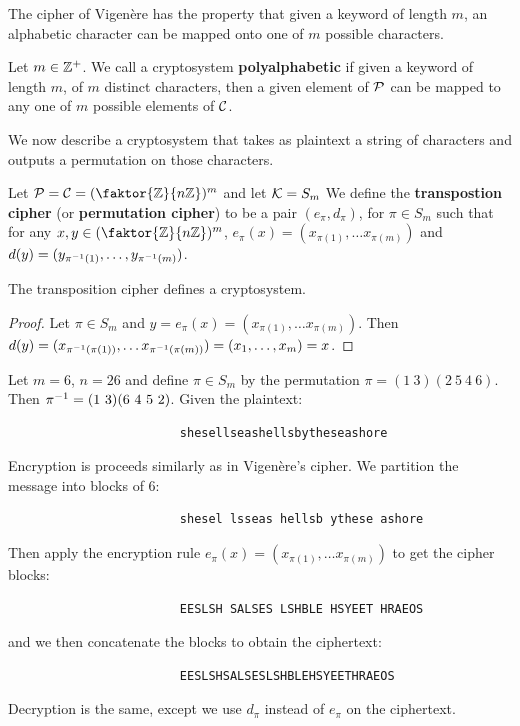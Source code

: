 The cipher of Vigen\`ere has the property that given a keyword of length $m$, an
alphabetic character can be mapped onto one of  $m$ possible characters.

\begin{definition}
    Let $m \in \mathbb{Z}^+$. We call a cryptosystem  \textbf{polyalphabetic} if given a
    keyword of length $m$, of  $m$ distinct characters, then a given element of
     $\mathcal{P}$ can be mapped to any one of  $m$ possible elements of  $\mathcal{C}$.
\end{definition}

We now describe a cryptosystem that takes as plaintext a string of characters
and outputs a permutation on those characters.

\begin{definition}
    Let $\Pc=\Cc=(\faktor{\Z}{n\Z})^m$ and let $\mathcal{K}=S_m$ We define the
    \textbf{transpostion cipher} (or \textbf{permutation cipher}) to be a pair
    $(e_{\pi},d_{\pi})$, for $\pi \in S_m$ such that for any  $x,y \in
    (\faktor{\Z}{n\Z})^m$, $e_{\pi}(x)=(x_{\pi(1)}, \dots x_{\pi(m)})$ and
    $d(y)=(y_{\pi^{-1}(1)}, \dots, y_{\pi^{-1}(m)})$.
\end{definition}

\begin{theorem}\label{1.1.9}
    The transposition cipher defines a cryptosystem.
\end{theorem}
\begin{proof}
    Let $\pi \in S_m$ and $y=e_{\pi}(x)=(x_{\pi(1)}, \dots x_{\pi(m)})$. Then
    $d(y)=(x_{\pi^{-1}(\pi(1))}, \dots x_{\pi^{-1}(\pi(m))})=(x_1, \dots,
    x_m)=x$.
\end{proof}

\begin{example}
    Let $m=6$,  $n=26$ and define  $\pi \in S_m$ by the permutation  $\pi=(1 \
    3)(2 \ 5 \ 4 \ 6)$. Then $\pi^{-1}=(1 \ 3)(6 \ 4 \ 5 \ 2)$. Given the
    plaintext:
    \begin{verbatim}
                        shesellseashellsbytheseashore

    \end{verbatim}
    Encryption is proceeds similarly as in Vigen\`ere's cipher. We partition the
    message into blocks of $6$:
    \begin{verbatim}
                        shesel lsseas hellsb ythese ashore
    \end{verbatim}
    Then apply the encryption rule $e_{\pi}(x)=(x_{\pi(1)}, \dots x_{\pi(m)})$
    to get the cipher blocks:
    \begin{verbatim}
                        EESLSH SALSES LSHBLE HSYEET HRAEOS
    \end{verbatim}
    and we then concatenate the blocks to obtain the ciphertext:
    \begin{verbatim}
                        EESLSHSALSESLSHBLEHSYEETHRAEOS
    \end{verbatim}
    Decryption is the same, except we use $d_\pi$ instead of  $e_\pi$ on the
    ciphertext.
\end{example}

